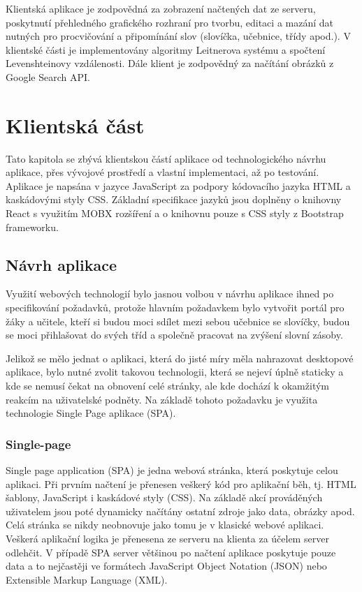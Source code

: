 \documentclass[a4paper,11pt,titlepage,fleqn]{article}
\begin{document}
        Klientská aplikace je zodpovědná za zobrazení načtených dat ze serveru, poskytnutí přehledného grafického rozhraní pro tvorbu, editaci a mazání dat nutných pro procvičování a připomínání slov (slovíčka, učebnice, třídy apod.). V klientské části je implementovány algoritmy Leitnerova systému a spočtení Levenshteinovy vzdálenosti. Dále klient je zodpovědný za načítání obrázků z Google Search API.


\newpage
\section{Klientská část}
    
    Tato kapitola se zbývá klientskou částí aplikace od technologického návrhu aplikace, přes vývojové prostředí a vlastní implementaci, až po testování. Aplikace je napsána v jazyce JavaScript za podpory kódovacího jazyka HTML a kaskádovými styly CSS. Základní specifikace jazyků jsou doplněny o knihovny React s využitím MOBX rozšíření a o knihovnu pouze s CSS styly z Bootstrap frameworku.

    \subsection{Návrh aplikace}
        Využití webových technologií bylo jasnou volbou v návrhu aplikace ihned po specifikování požadavků, protože hlavním požadavkem bylo vytvořit portál pro žáky a učitele, kteří si budou moci sdílet mezi sebou učebnice se slovíčky, budou se moci přihlašovat do svých tříd a společně pracovat na zvýšení slovní zásoby. 

        Jelikož se mělo jednat o aplikaci, která do jisté míry měla nahrazovat desktopové aplikace, bylo nutné zvolit takovou technologii, která se nejeví úplně staticky a kde se nemusí čekat na obnovení celé stránky, ale kde dochází k okamžitým reakcím na uživatelské podněty. Na základě tohoto požadavku je využita technologie Single Page aplikace (SPA).   


        \subsubsection{Single-page}
            Single page application (SPA) je jedna webová stránka, která poskytuje celou aplikaci. Při prvním načtení je přenesen veškerý kód pro aplikační běh, tj. HTML šablony, JavaScript i kaskádové styly (CSS). Na základě akcí prováděných uživatelem jsou poté dynamicky načítány ostatní zdroje jako data, obrázky apod. Celá stránka se nikdy neobnovuje jako tomu je v klasické webové aplikaci. Veškerá aplikační logika je přenesena ze serveru na klienta za účelem server odlehčit. V případě SPA server většinou po načtení aplikace poskytuje pouze data a to nejčastěji ve formátech JavaScript Object Notation (JSON) nebo Extensible Markup Language (XML).
\end{document}
